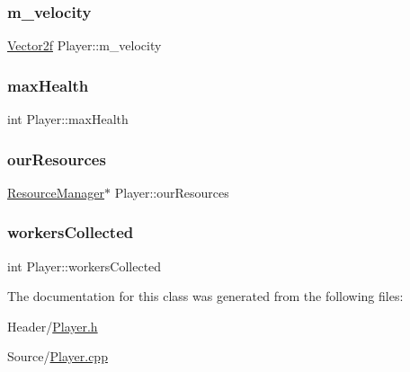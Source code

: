 \mbox{\label{class_player_a770194ea3e16274ea08fbcbc6d47e76f}} 
\subsubsection{\texorpdfstring{m\_velocity}{m\_velocity}}
{\footnotesize\ttfamily \mbox{\hyperlink{class_vector2f}{Vector2f}} Player\+::m\+\_\+velocity}

\mbox{\label{class_player_a2196f0d382a1d97c739a036781b2316b}} 
\subsubsection{\texorpdfstring{maxHealth}{maxHealth}}
{\footnotesize\ttfamily int Player\+::max\+Health}

\mbox{\label{class_player_ac84e59bad7aa8bf5d9146d1e6b0e8b60}} 
\subsubsection{\texorpdfstring{ourResources}{ourResources}}
{\footnotesize\ttfamily \mbox{\hyperlink{class_resource_manager}{Resource\+Manager}}$\ast$ Player\+::our\+Resources}

\mbox{\label{class_player_a5be44b48759fcff995237e50ebbcd4be}} 
\subsubsection{\texorpdfstring{workersCollected}{workersCollected}}
{\footnotesize\ttfamily int Player\+::workers\+Collected}



The documentation for this class was generated from the following files\+:\begin{DoxyCompactItemize}
\item 
Header/\mbox{\hyperlink{_player_8h}{Player.\+h}}\item 
Source/\mbox{\hyperlink{_player_8cpp}{Player.\+cpp}}\end{DoxyCompactItemize}
